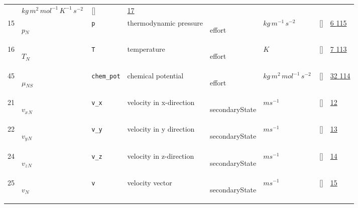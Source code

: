 \begin{longtable}{|p{1cm}|p{3cm}|p{3cm}|p{7cm}|p{3.0cm}|p{3cm}|p{2cm}|p{1cm}|}
             & $ kg \,m^{2} \,mol^{-1} \,K^{-1} \,s^{-2} \, $
             & []
             & \hyperlink{"e:17"}{ 17 }
                 \\
    15
             & \hypertarget{"v:15"}{ $ {p}{_{N}} $}
             & \verb|p|
             & thermodynamic pressure
             & \begin{lay}effort \end{lay}
             & $ kg \,m^{-1} \,s^{-2} \, $
             & []
             & \hyperlink{"e:6"}{ 6 }
                 \hyperlink{"e:115"}{ 115 }
                 \\
    16
             & \hypertarget{"v:16"}{ $ {T}{_{N}} $}
             & \verb|T|
             & temperature
             & \begin{lay}effort \end{lay}
             & $ K \, $
             & []
             & \hyperlink{"e:7"}{ 7 }
                 \hyperlink{"e:113"}{ 113 }
                 \\
    45
             & \hypertarget{"v:45"}{ $ {\mu}{_{{N S}}} $}
             & \verb|chem_pot|
             & chemical potential
             & \begin{lay}effort \end{lay}
             & $ kg \,m^{2} \,mol^{-1} \,s^{-2} \, $
             & []
             & \hyperlink{"e:32"}{ 32 }
                 \hyperlink{"e:114"}{ 114 }
                 \\
    21
             & \hypertarget{"v:21"}{ $ {v_x}{_{N}} $}
             & \verb|v_x|
             & velocity in x-direction
             & \begin{lay}secondaryState \end{lay}
             & $ m s^{-1} \, $
             & []
             & \hyperlink{"e:12"}{ 12 }
                 \\
    22
             & \hypertarget{"v:22"}{ $ {v_y}{_{N}} $}
             & \verb|v_y|
             & velocity in y direction
             & \begin{lay}secondaryState \end{lay}
             & $ m s^{-1} \, $
             & []
             & \hyperlink{"e:13"}{ 13 }
                 \\
    24
             & \hypertarget{"v:24"}{ $ {v_z}{_{N}} $}
             & \verb|v_z|
             & velocity in z-direction
             & \begin{lay}secondaryState \end{lay}
             & $ m s^{-1} \, $
             & []
             & \hyperlink{"e:14"}{ 14 }
                 \\
    25
             & \hypertarget{"v:25"}{ $ {v}{_{N}} $}
             & \verb|v|
             & velocity vector
             & \begin{lay}secondaryState \end{lay}
             & $ m s^{-1} \, $
             & []
             & \hyperlink{"e:15"}{ 15 }
                 \\
    \end{longtable}
